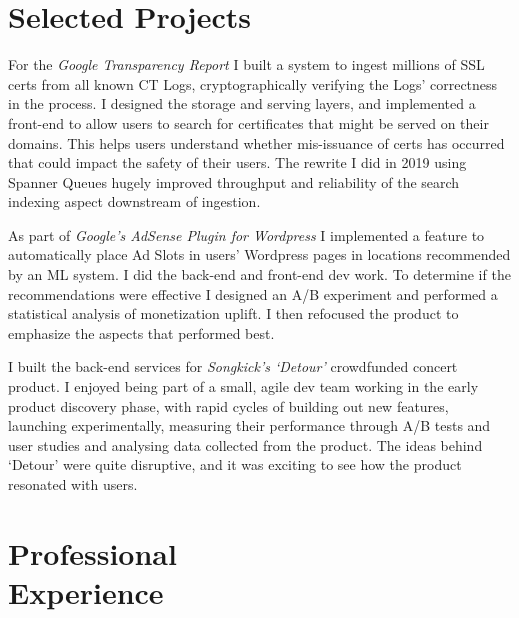 \documentclass[line]{resume}
\begin{document}
\begin{resume}
    \section{\mysidestyle Selected Projects}

    For the \textsl{Google Transparency Report} I built a system to ingest millions of SSL certs from all known CT Logs,
    cryptographically verifying the Logs' correctness in the process.  I designed the storage and serving layers, and
    implemented a front-end to allow users to search for certificates that might be served on their domains.  This
    helps users understand whether mis-issuance of certs has occurred that could impact the safety of their users. The
    rewrite I did in 2019 using Spanner Queues hugely improved throughput and reliability of the search indexing aspect
    downstream of ingestion.

    As part of \textsl{Google's AdSense Plugin for Wordpress} I implemented a feature to automatically place Ad Slots
    in users' Wordpress pages in locations recommended by an ML system. I did the back-end and front-end dev work.  To
    determine if the recommendations were effective I designed an A/B experiment and performed a statistical analysis
    of monetization uplift.  I then refocused the product to emphasize the aspects that performed best.

    I built the back-end services for \textsl{Songkick's `Detour'} crowdfunded concert product. I enjoyed
    being part of a small, agile dev team working in the early product discovery phase, with rapid cycles of building
    out new features, launching experimentally, measuring their performance through A/B tests and user studies and
    analysing data collected from the product. The ideas behind `Detour' were quite disruptive, and it was exciting to
    see how the product resonated with users.

    \section{\mysidestyle Professional\\Experience}


\end{resume}
\end{document}
